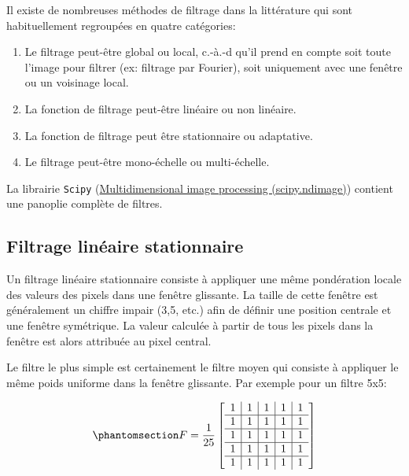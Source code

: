 \documentclass[
  french,
  11pt,
  letterpaper,
  open=any,
  twoside=false,
  french]{scrbook}
\begin{document}
Il existe de nombreuses méthodes de filtrage dans la littérature qui
sont habituellement regroupées en quatre catégories:

\begin{enumerate}
\def\labelenumi{\arabic{enumi}.}
\item
  Le filtrage peut-être global ou local, c.-à.-d qu'il prend en compte
  soit toute l'image pour filtrer (ex: filtrage par Fourier), soit
  uniquement avec une fenêtre ou un voisinage local.
\item
  La fonction de filtrage peut-être linéaire ou non linéaire.
\item
  La fonction de filtrage peut être stationnaire ou adaptative.
\item
  Le filtrage peut-être mono-échelle ou multi-échelle.
\end{enumerate}

La librairie \texttt{Scipy}
(\href{https://docs.scipy.org/doc/scipy/reference/ndimage.html}{Multidimensional
image processing (scipy.ndimage)}) contient une panoplie complète de
filtres.

\subsection{Filtrage linéaire
stationnaire}\label{filtrage-linuxe9aire-stationnaire}

Un filtrage linéaire stationnaire consiste à appliquer une même
pondération locale des valeurs des pixels dans une fenêtre glissante. La
taille de cette fenêtre est généralement un chiffre impair (3,5, etc.)
afin de définir une position centrale et une fenêtre symétrique. La
valeur calculée à partir de tous les pixels dans la fenêtre est alors
attribuée au pixel central.

Le filtre le plus simple est certainement le filtre moyen qui consiste à
appliquer le même poids uniforme dans la fenêtre glissante. Par exemple
pour un filtre 5x5:

\begin{equation}\protect\phantomsection\label{eq-boxfilter}{
F= \frac{1}{25}\left[
\begin{array}{c|c|c|c|c}
1 & 1 & 1 & 1 & 1 \\
\hline
1 & 1 & 1 & 1 & 1 \\
\hline
1 & 1 & 1 & 1 & 1 \\
\hline
1 & 1 & 1 & 1 & 1 \\
\hline
1 & 1 & 1 & 1 & 1
\end{array}
\right]
}\end{equation}
\end{document}
